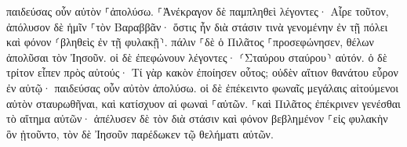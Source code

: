 \documentclass{openreader}
\begin{document}
παιδεύσας οὖν αὐτὸν ⸀ἀπολύσω. 
⸀Ἀνέκραγον δὲ παμπληθεὶ λέγοντες· Αἶρε τοῦτον, ἀπόλυσον δὲ ἡμῖν ⸀τὸν Βαραββᾶν· 
ὅστις ἦν διὰ στάσιν τινὰ γενομένην ἐν τῇ πόλει καὶ φόνον ⸂βληθεὶς ἐν τῇ φυλακῇ⸃. 
πάλιν ⸀δὲ ὁ Πιλᾶτος ⸀προσεφώνησεν, θέλων ἀπολῦσαι τὸν Ἰησοῦν. 
οἱ δὲ ἐπεφώνουν λέγοντες· ⸂Σταύρου σταύρου⸃ αὐτόν. 
ὁ δὲ τρίτον εἶπεν πρὸς αὐτούς· Τί γὰρ κακὸν ἐποίησεν οὗτος; οὐδὲν αἴτιον θανάτου εὗρον ἐν αὐτῷ· παιδεύσας οὖν αὐτὸν ἀπολύσω. 
οἱ δὲ ἐπέκειντο φωναῖς μεγάλαις αἰτούμενοι αὐτὸν σταυρωθῆναι, καὶ κατίσχυον αἱ φωναὶ ⸀αὐτῶν. 
⸀καὶ Πιλᾶτος ἐπέκρινεν γενέσθαι τὸ αἴτημα αὐτῶν· 
ἀπέλυσεν δὲ τὸν διὰ στάσιν καὶ φόνον βεβλημένον ⸀εἰς φυλακὴν ὃν ᾐτοῦντο, τὸν δὲ Ἰησοῦν παρέδωκεν τῷ θελήματι αὐτῶν. 
\end{document}
